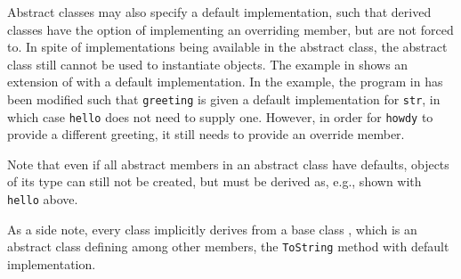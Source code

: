 \documentclass[fsharpNotes.tex]{subfiles}
\begin{document}
Abstract classes may also specify a default implementation, such that derived classes have the option of implementing an overriding member, but are not forced to. In spite of implementations being available in the abstract class, the abstract class still cannot be used to instantiate objects. The example in  shows an extension of  with a default implementation.
%
%
%
In the example, the program in  has been modified such that \lstinline{greeting} is given a default implementation for \lstinline{str}, in which case \lstinline{hello} does not need to supply one. However, in order for \lstinline{howdy} to provide a different greeting, it still needs to provide an override member. 

Note that even if all abstract members in an abstract class have defaults, objects of its type can still not be created, but must be derived as, e.g., shown with \lstinline{hello} above.

As a side note, every class implicitly derives from a base class , which is an abstract class defining among other members, the \lstinline{ToString} method with default implementation.
\end{document}
